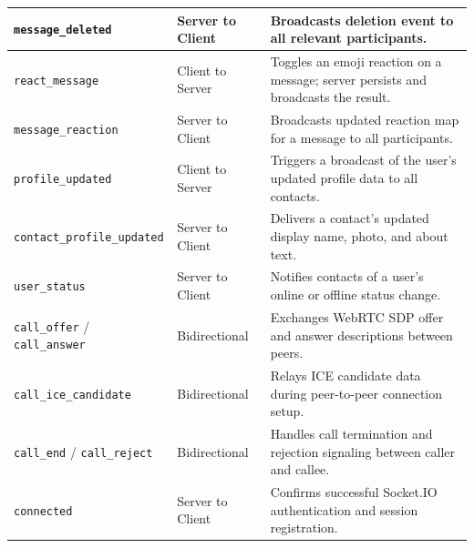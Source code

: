\documentclass[12pt,a4paper,oneside]{report}
\begin{document}
\begin{longtable}{|p{4.8cm}|p{2.8cm}|p{6.2cm}|}
\hline
\texttt{message\_deleted} & Server to Client & Broadcasts deletion event to all relevant participants. \\
\hline
\texttt{react\_message} & Client to Server & Toggles an emoji reaction on a message; server persists and broadcasts the result. \\
\hline
\texttt{message\_reaction} & Server to Client & Broadcasts updated reaction map for a message to all participants. \\
\hline
\texttt{profile\_updated} & Client to Server & Triggers a broadcast of the user's updated profile data to all contacts. \\
\hline
\texttt{contact\_profile\_updated} & Server to Client & Delivers a contact's updated display name, photo, and about text. \\
\hline
\texttt{user\_status} & Server to Client & Notifies contacts of a user's online or offline status change. \\
\hline
\texttt{call\_offer} / \texttt{call\_answer} & Bidirectional & Exchanges WebRTC SDP offer and answer descriptions between peers. \\
\hline
\texttt{call\_ice\_candidate} & Bidirectional & Relays ICE candidate data during peer-to-peer connection setup. \\
\hline
\texttt{call\_end} / \texttt{call\_reject} & Bidirectional & Handles call termination and rejection signaling between caller and callee. \\
\hline
\texttt{connected} & Server to Client & Confirms successful Socket.IO authentication and session registration. \\
\hline
\end{longtable}
\end{document}
